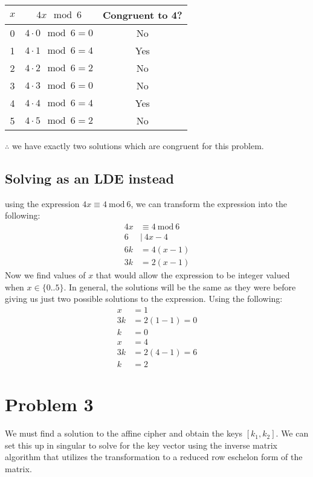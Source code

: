 \documentclass[11pt]{article}
\begin{document}
\begin{center}
\begin{tabular}{|c|c|c|}
\hline
\( x \) & \( 4x \mod 6 \) & Congruent to 4? \\
\hline
0 & \( 4 \cdot 0 \mod 6 = 0 \) & No \\
1 & \( 4 \cdot 1 \mod 6 = 4 \) & Yes \\
2 & \( 4 \cdot 2 \mod 6 = 2 \) & No \\
3 & \( 4 \cdot 3 \mod 6 = 0 \) & No \\
4 & \( 4 \cdot 4 \mod 6 = 4 \) & Yes \\
5 & \( 4 \cdot 5 \mod 6 = 2 \) & No \\
\hline
\end{tabular}
\end{center}
\(\therefore\) we have exactly two solutions which are congruent for this problem.

\subsection{Solving as an LDE instead}
\label{sec:org1d80056}
using the expression \(4x \equiv 4\ \text{mod}\ 6\), we can transform the expression into the following:
\begin{align*}
4x &\equiv 4\ \text{mod}\ 6\\
6 &|\ 4x - 4\\
6k &= 4(x - 1)\\
3k &= 2(x - 1)
\end{align*}
Now we find values of $x$ that would allow the expression to be integer valued when $x \in \{0..5\}$. In general, the solutions will be the same as they were before giving us just two possible solutions to the expression. Using the following:
\begin{align*}
 x &= 1\\
 3k &= 2(1 - 1) = 0\\
 k &= 0 \\
 x &= 4\\
 3k &= 2(4 - 1) = 6\\
 k &= 2 
\end{align*}

\section{Problem 3}
\label{sec:org7d156fd}
We must find a solution to the affine cipher and obtain the keys \([k_1, k_2]\). We can set this up in singular to solve for the key vector using the inverse matrix algorithm that utilizes the transformation to a reduced row eschelon form of the matrix.
\end{document}
